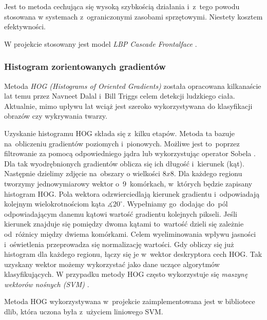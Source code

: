 \par

Jest to metoda cechująca się wysoką szybkością działania i~z~tego powodu stosowana w systemach z~ograniczonymi zasobami sprzętowymi. Niestety kosztem efektywności.

\par

W projekcie stosowany jest model \textit{LBP Cascade Frontalface} \cite{lbp_xml}.


\subsubsection{Histogram zorientowanych gradientów}
Metoda \textit{HOG (Histograms of Oriented Gradients)} \cite{hog_article} została opracowana kilkanaście lat temu przez Navneet Dalal i~Bill Triggs celem detekcji ludzkiego ciała. Aktualnie, mimo upływu lat wciąż jest szeroko wykorzystywana do klasyfikacji obrazów czy wykrywania twarzy.

\par

Uzyskanie histogramu HOG składa się z~kilku etapów. Metoda \cite{hog_wprowadzenie} \cite{learnopencv_HOG} \cite{guide_hog} ta bazuje na~obliczeniu gradientów poziomych i~pionowych. Możliwe jest to~poprzez filtrowanie za pomocą odpowiedniego jądra lub wykorzystując operator Sobela \cite{feature_extraction}. Dla tak wyodrębnionych gradientów oblicza się ich długość i~kierunek (kąt). Następnie dzielimy zdjęcie na~obszary o wielkości $8x8$. Dla każdego regionu tworzymy jednowymiarowy wektor o~9~komórkach, w~których będzie zapisany histogram HOG. Pola wektora odzwierciedlają kierunek gradientu i~odpowiadają kolejnym wielokrotnościom kąta $\measuredangle 20 ^{\circ}$. Wypełniamy go~dodając do~pól odpowiadającym danemu kątowi wartość gradientu kolejnych pikseli. Jeśli kierunek znajduje się pomiędzy dwoma kątami to~wartość dzieli się zależnie od~różnicy między dwiema komórkami. Celem wyeliminowania wpływu jasności i~oświetlenia przeprowadza się normalizację wartości. Gdy obliczy się już histogram dla każdego regionu, łączy się je w~wektor deskryptora cech HOG. Tak uzyskany wektor możemy wykorzystać jako dane uczące algorytmów klasyfikujących. W przypadku metody HOG często wykorzystuje się \textit{maszynę wektorów nośnych (SVM)} \cite{svm_toward_science}.

\vspace{5mm}

Metoda HOG wykorzystywana w~projekcie zaimplementowana jest w bibliotece dlib, która uczona była z~użyciem liniowego SVM.



